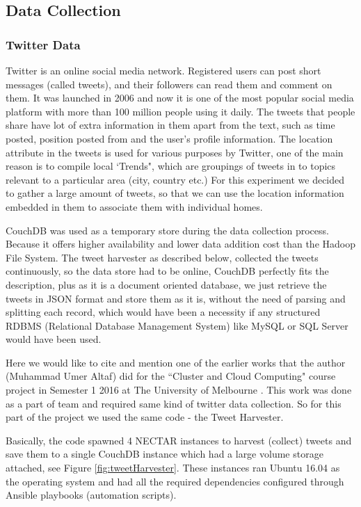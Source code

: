 \documentclass[12pt]{report}
\theoremstyle{named}
\begin{document}
\subsection{Data Collection}
\label{sec:DataCollection}
\subsubsection{Twitter Data}
Twitter is an online social media network. Registered users can post short messages (called tweets), and their followers can read them and comment on them. It was launched in 2006 and now it is one of the most popular social media platform with more than 100 million people using it daily. The tweets that people share have lot of extra information in them apart from the text, such as time posted, position posted from and the user's profile information. The location attribute in the tweets is used for various purposes by Twitter, one of the main reason is to compile local `Trends", which are groupings of tweets in to topics relevant to a particular area (city, country etc.) For this experiment we decided to gather a large amount of tweets, so that we can use the location information embedded in them to associate them with individual homes.

CouchDB was used as a temporary store during the data collection process. Because it offers higher availability and lower data addition cost than the Hadoop File System. The tweet harvester as described below, collected the tweets continuously, so the data store had to be online, CouchDB perfectly fits the description, plus as it is a document oriented database, we just retrieve the tweets in JSON format and store them as it is, without the need of parsing and splitting each record, which would have been a necessity if any structured RDBMS (Relational Database Management System) like MySQL or SQL Server would have been used.

Here we would like to cite and mention one of the earlier works that the author (Muhammad Umer Altaf) did for the ``Cluster and Cloud Computing" course project in Semester 1 2016 at The University of Melbourne \cite{clusterCloudReport}. This work was done as a part of team and required same kind of twitter data collection. So for this part of the project we used the same code - the Tweet Harvester.

Basically, the code spawned 4 NECTAR instances to harvest (collect) tweets and save them to a single CouchDB instance which had a large volume storage attached, see Figure \ref{fig:tweetHarvester}. These instances ran Ubuntu 16.04 as the operating system and had all the required dependencies configured through Ansible playbooks (automation scripts).
\end{document}
